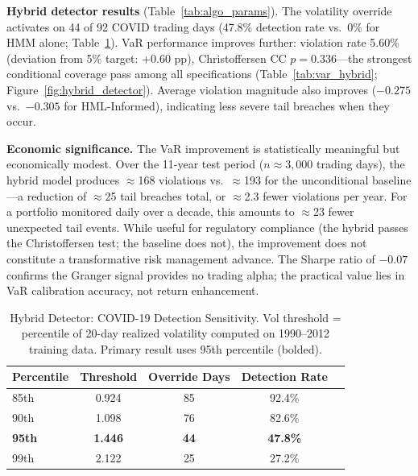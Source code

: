 \documentclass[sigconf,anonymous]{acmart}
\begin{document}
\textbf{Hybrid detector results} (Table~\ref{tab:algo_params}). The volatility override activates on 44 of 92
COVID trading days (47.8\% detection rate vs.\ 0\% for HMM alone;
Table~\ref{tab:hybrid_sensitivity}). VaR performance improves further:
violation rate 5.60\% (deviation from 5\% target: $+0.60$ pp), Christoffersen
CC $p = 0.336$---the strongest conditional coverage pass among all specifications
(Table~\ref{tab:var_hybrid}; Figure~\ref{fig:hybrid_detector}). Average violation magnitude also improves
($-0.275$ vs.\ $-0.305$ for HML-Informed), indicating less severe tail breaches
when they occur.

\textbf{Economic significance.}
The VaR improvement is statistically meaningful but economically modest.
Over the 11-year test period ($n \approx 3{,}000$ trading days), the hybrid model
produces $\approx$168 violations vs.\ $\approx$193 for the unconditional baseline---a
reduction of $\approx$25 tail breaches total, or $\approx$2.3 fewer violations per year.
For a portfolio monitored daily over a decade, this amounts to $\approx$23 fewer
unexpected tail events.
While useful for regulatory compliance (the hybrid passes the Christoffersen test; the baseline does not),
the improvement does not constitute a transformative risk management advance.
The Sharpe ratio of $-0.07$ confirms the Granger signal provides no trading alpha;
the practical value lies in VaR calibration accuracy, not return enhancement.

\begin{table}[t]
\centering
\caption{Hybrid Detector: COVID-19 Detection Sensitivity. Vol threshold =
percentile of 20-day realized volatility computed on 1990--2012 training data.
Primary result uses 95th percentile (bolded).}
\label{tab:hybrid_sensitivity}
\small
\begin{tabular}{lcccc}
\toprule
Percentile & Threshold & Override Days & Detection Rate \\
\midrule
85th & 0.924 & 85 & 92.4\% \\
90th & 1.098 & 76 & 82.6\% \\
\textbf{95th} & \textbf{1.446} & \textbf{44} & \textbf{47.8\%} \\
99th & 2.122 & 25 & 27.2\% \\
\bottomrule
\end{tabular}
\end{table}
\end{document}

